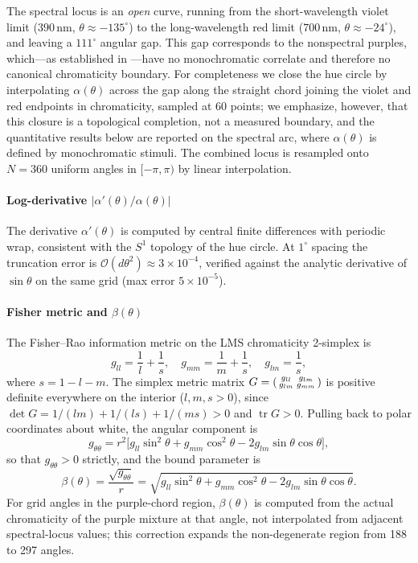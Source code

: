 \documentclass[preprint,12pt,authoryear]{elsarticle}
\theoremstyle{plain}
\theoremstyle{definition}
\theoremstyle{remark}
\begin{document}
The spectral locus is an \emph{open} curve, running from the short-wavelength violet limit ($390$\,nm, $\theta\approx-135^\circ$) to the long-wavelength red limit ($700$\,nm, $\theta\approx-24^\circ$), and leaving a $111^\circ$ angular gap. This gap corresponds to the nonspectral purples, which---as established in ---have no monochromatic correlate and therefore no canonical chromaticity boundary. For completeness we close the hue circle by interpolating $\alpha(\theta)$ across the gap along the straight chord joining the violet and red endpoints in chromaticity, sampled at 60 points; we emphasize, however, that this closure is a topological completion, not a measured boundary, and the quantitative results below are reported on the spectral arc, where $\alpha(\theta)$ is defined by monochromatic stimuli. The combined locus is resampled onto $N=360$ uniform angles in $[-\pi,\pi)$ by linear interpolation.

\paragraph{Log-derivative \texorpdfstring{$|\alpha'(\theta)/\alpha(\theta)|$}{|alpha'/alpha|}}
The derivative $\alpha'(\theta)$ is computed by central finite differences with periodic wrap, consistent with the $S^1$ topology of the hue circle. At $1^\circ$ spacing the truncation error is $\mathcal{O}(d\theta^2)\approx3\times10^{-4}$, verified against the analytic derivative of $\sin\theta$ on the same grid (max error $5\times10^{-5}$).

\paragraph{Fisher metric and \texorpdfstring{$\beta(\theta)$}{beta(theta)}}
The Fisher--Rao information metric on the LMS chromaticity 2-simplex is \citep{Rao1945}
\[
g_{ll}=\frac{1}{l}+\frac{1}{s},\quad
g_{mm}=\frac{1}{m}+\frac{1}{s},\quad
g_{lm}=\frac{1}{s},
\]
where $s=1-l-m$. The simplex metric matrix $G=\begin{psmallmatrix} g_{ll} & g_{lm}\\ g_{lm} & g_{mm}\end{psmallmatrix}$ is positive definite everywhere on the interior ($l,m,s>0$), since $\det G = 1/(lm)+1/(ls)+1/(ms)>0$ and $\operatorname{tr}G>0$. Pulling back to polar coordinates about white, the angular component is
\[
g_{\theta\theta}=r^2\bigl[g_{ll}\sin^2\theta+g_{mm}\cos^2\theta-2g_{lm}\sin\theta\cos\theta\bigr],
\]
so that $g_{\theta\theta}>0$ strictly, and the bound parameter is
\[
\beta(\theta)=\frac{\sqrt{g_{\theta\theta}}}{r}
=\sqrt{g_{ll}\sin^2\theta+g_{mm}\cos^2\theta-2g_{lm}\sin\theta\cos\theta}.
\]
For grid angles in the purple-chord region, $\beta(\theta)$ is computed from the actual chromaticity of the purple mixture at that angle, not interpolated from adjacent spectral-locus values; this correction expands the non-degenerate region from 188 to 297 angles.
\end{document}
